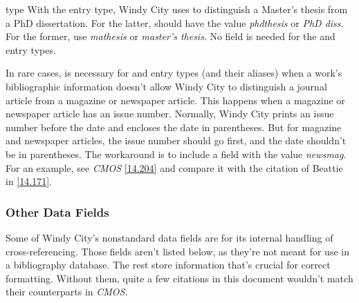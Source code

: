 \documentclass[11pt,letterpaper,oneside]{article}
\begin{document}
\begin{marglist}
\item[type] With the  entry type, Windy City uses
 to distinguish a Master's thesis from a PhD
dissertation. For the latter,  should have the value
\textit{phdthesis} or \textit{PhD diss.} For the former, use
\textit{mathesis} or \textit{master's thesis}. No 
field is needed for the  and 
entry types.

In rare cases,  is necessary for  and
 entry types (and their aliases) when a work's
bibliographic information doesn't allow Windy City to distinguish a
journal article from a magazine or newspaper article. This happens
when a magazine or newspaper article has an issue number. Normally,
Windy City prints an issue number before the date and encloses the
date in parentheses. But for magazine and newspaper articles, the
issue number should go first, and the date shouldn't be in
parentheses. The workaround is to include a  field with
the value \textit{newsmag}. For an example, see \textit{CMOS}
\ref{14.204} and compare it with the citation of Beattie in
\ref{14.171}.

\end{marglist}

\subsubsection{Other Data Fields}
\label{otherfields}

Some of Windy City's nonstandard data fields are for its internal
handling of cross-referencing. Those fields aren't listed below, as
they're not meant for use in a bibliography database. The rest store
information that's crucial for correct formatting. Without them, quite
a few citations in this document wouldn't match their counterparts in
\textit{CMOS}.
\end{document}
